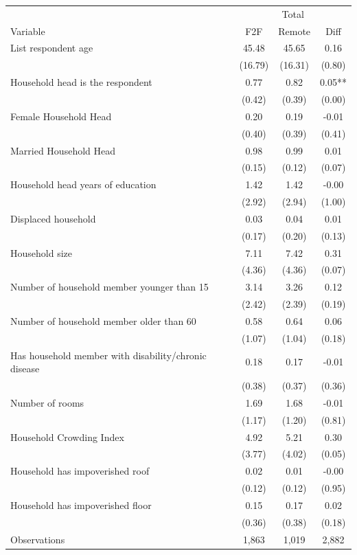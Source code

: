 \begin{tabular}{l*{3}c}
\hline\hline
 & \multicolumn{3}{c}{Total}\\ 
Variable & F2F & Remote & Diff \\
\hline
List respondent age&45.48&45.65&0.16\\
&(16.79)&(16.31)&(0.80)\\
Household head is the respondent&0.77&0.82&0.05**\\
&(0.42)&(0.39)&(0.00)\\
Female Household Head&0.20&0.19&-0.01\\
&(0.40)&(0.39)&(0.41)\\
Married Household Head&0.98&0.99&0.01\\
&(0.15)&(0.12)&(0.07)\\
Household head years of education&1.42&1.42&-0.00\\
&(2.92)&(2.94)&(1.00)\\
Displaced household&0.03&0.04&0.01\\
&(0.17)&(0.20)&(0.13)\\
Household size&7.11&7.42&0.31\\
&(4.36)&(4.36)&(0.07)\\
Number of household member younger than 15&3.14&3.26&0.12\\
&(2.42)&(2.39)&(0.19)\\
Number of household member older than 60&0.58&0.64&0.06\\
&(1.07)&(1.04)&(0.18)\\
Has household member with disability/chronic disease&0.18&0.17&-0.01\\
&(0.38)&(0.37)&(0.36)\\
Number of rooms&1.69&1.68&-0.01\\
&(1.17)&(1.20)&(0.81)\\
Household Crowding Index&4.92&5.21&0.30\\
&(3.77)&(4.02)&(0.05)\\
Household has impoverished roof&0.02&0.01&-0.00\\
&(0.12)&(0.12)&(0.95)\\
Household has impoverished floor&0.15&0.17&0.02\\
&(0.36)&(0.38)&(0.18)\\
\hline
Observations & 1,863 & 1,019 & 2,882 \\
\hline\hline
\end{tabular}
